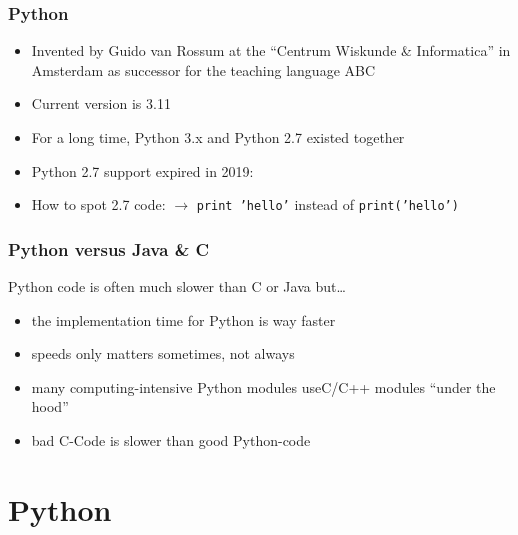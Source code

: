 \documentclass[ngerman]{beamer}
\begin{document}
\begin{frame}

\tableofcontents

\end{frame}


\begin{frame}
\frametitle{Python}

\begin{itemize}
	\item Invented by Guido van Rossum at the \enquote{Centrum Wiskunde \& Informatica} in Amsterdam as successor for the teaching language ABC
	\item Current version is 3.11
	\item For a long time, Python 3.x and Python 2.7 existed together
	\item Python 2.7 support expired in 2019:
	\item How to spot 2.7 code: $\rightarrow$ \texttt{print 'hello'} instead of \texttt{print('hello')}
\end{itemize}

\end{frame}

\begin{frame}
\frametitle{Python versus Java \& C}

Python code is often much slower than C or Java but\ldots

\begin{itemize}
\item the implementation time for Python is way faster
\item speeds only matters sometimes, not always
\item many computing-intensive Python modules use\newline C/C++ modules \enquote{under the hood}
\item bad C-Code is slower than good Python-code
\end{itemize}
\end{frame}




\section{Python}
\end{document}
